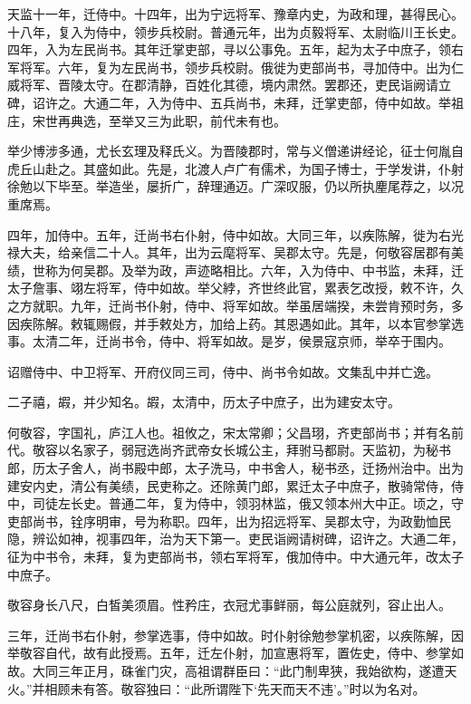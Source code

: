 \documentclass[12pt,UTF8]{ctexbook}
\begin{document}
天监十一年，迁侍中。十四年，出为宁远将军、豫章内史，为政和理，甚得民心。十八年，复入为侍中，领步兵校尉。普通元年，出为贞毅将军、太尉临川王长史。四年，入为左民尚书。其年迁掌吏部，寻以公事免。五年，起为太子中庶子，领右军将军。六年，复为左民尚书，领步兵校尉。俄徙为吏部尚书，寻加侍中。出为仁威将军、晋陵太守。在郡清静，百姓化其德，境内肃然。罢郡还，吏民诣阙请立碑，诏许之。大通二年，入为侍中、五兵尚书，未拜，迁掌吏部，侍中如故。举祖庄，宋世再典选，至举又三为此职，前代未有也。

举少博涉多通，尤长玄理及释氏义。为晋陵郡时，常与义僧递讲经论，征士何胤自虎丘山赴之。其盛如此。先是，北渡人卢广有儒术，为国子博士，于学发讲，仆射徐勉以下毕至。举造坐，屡折广，辞理通迈。广深叹服，仍以所执麈尾荐之，以况重席焉。

四年，加侍中。五年，迁尚书右仆射，侍中如故。大同三年，以疾陈解，徙为右光禄大夫，给亲信二十人。其年，出为云麾将军、吴郡太守。先是，何敬容居郡有美绩，世称为何吴郡。及举为政，声迹略相比。六年，入为侍中、中书监，未拜，迁太子詹事、翊左将军，侍中如故。举父綍，齐世终此官，累表乞改授，敕不许，久之方就职。九年，迁尚书仆射，侍中、将军如故。举虽居端揆，未尝肯预时务，多因疾陈解。敕辄赐假，并手敕处方，加给上药。其恩遇如此。其年，以本官参掌选事。太清二年，迁尚书令，侍中、将军如故。是岁，侯景寇京师，举卒于围内。

诏赠侍中、中卫将军、开府仪同三司，侍中、尚书令如故。文集乱中并亡逸。

二子禧，嘏，并少知名。嘏，太清中，历太子中庶子，出为建安太守。

何敬容，字国礼，庐江人也。祖攸之，宋太常卿；父昌珝，齐吏部尚书；并有名前代。敬容以名家子，弱冠选尚齐武帝女长城公主，拜驸马都尉。天监初，为秘书郎，历太子舍人，尚书殿中郎，太子洗马，中书舍人，秘书丞，迁扬州治中。出为建安内史，清公有美绩，民吏称之。还除黄门郎，累迁太子中庶子，散骑常侍，侍中，司徒左长史。普通二年，复为侍中，领羽林监，俄又领本州大中正。顷之，守吏部尚书，铨序明审，号为称职。四年，出为招远将军、吴郡太守，为政勤恤民隐，辨讼如神，视事四年，治为天下第一。吏民诣阙请树碑，诏许之。大通二年，征为中书令，未拜，复为吏部尚书，领右军将军，俄加侍中。中大通元年，改太子中庶子。

敬容身长八尺，白皙美须眉。性矜庄，衣冠尤事鲜丽，每公庭就列，容止出人。

三年，迁尚书右仆射，参掌选事，侍中如故。时仆射徐勉参掌机密，以疾陈解，因举敬容自代，故有此授焉。五年，迁左仆射，加宣惠将军，置佐史，侍中、参掌如故。大同三年正月，硃雀门灾，高祖谓群臣曰：“此门制卑狭，我始欲构，遂遭天火。”并相顾未有答。敬容独曰：“此所谓陛下‘先天而天不违’。”时以为名对。
\end{document}
